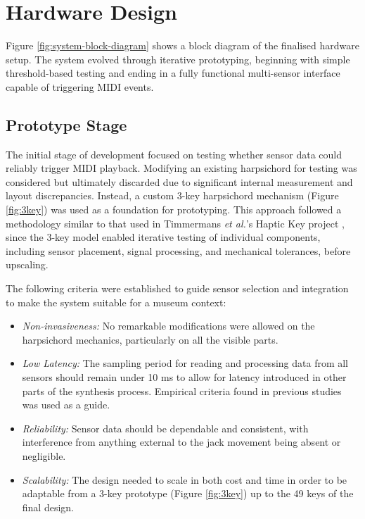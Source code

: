 \section{Hardware Design}\label{hardware-design}





Figure \ref{fig:system-block-diagram} shows a block diagram of the finalised hardware setup. 
The system evolved through iterative prototyping, beginning with simple threshold-based testing and ending in a fully functional multi-sensor interface capable of triggering MIDI events. 



\subsection{Prototype Stage}

The initial stage of development focused on testing whether sensor data could reliably trigger MIDI playback. Modifying an existing harpsichord for testing was considered but ultimately discarded due to significant internal measurement and layout discrepancies. Instead, a custom 3-key harpsichord mechanism (Figure \ref{fig:3key}) was used as a foundation for prototyping. This approach followed a methodology similar to that used in Timmermans \emph{et al.}'s Haptic Key project \cite{Timmermans2020}, since the 3-key model enabled iterative testing of individual components, including sensor placement, signal processing, and mechanical tolerances, before upscaling. 

The following criteria were established to guide sensor selection and integration to make the system suitable for a museum context:

\begin{itemize}
    \item \emph{Non-invasiveness:} No remarkable modifications were allowed on the harpsichord mechanics, particularly on all the visible parts.
    \item \emph{Low Latency:} The sampling period for reading and processing data from all sensors should remain under 10 ms to allow for latency introduced in other parts of the synthesis process. Empirical criteria found in previous studies \cite{Jack2016} was used as a guide.
    \item \emph{Reliability:} Sensor data should be dependable and consistent, with interference from anything external to the jack movement being absent or negligible.
    \item \emph{Scalability:} The design needed to scale in both cost and time in order to be adaptable from a 3-key prototype (Figure \ref{fig:3key}) up to the 49 keys of the final design.
\end{itemize}

